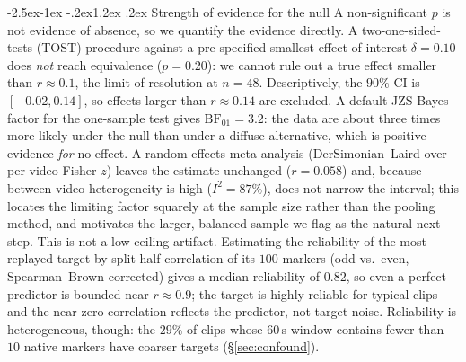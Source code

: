 \documentclass[11pt]{article}
\makeatletter
\renewcommand\subsection{\@startsection{subsection}{2}{\z@}%
  {-2.5ex\@plus -1ex \@minus -.2ex}{1.2ex \@plus .2ex}%
  {\normalfont\normalsize\sffamily\bfseries}}
\makeatother
\begin{document}
\subsection{Strength of evidence for the null}\label{sec:equiv}
A non-significant $p$ is not evidence of absence, so we quantify the evidence directly. A
two-one-sided-tests (TOST) procedure against a pre-specified smallest effect of interest
$\delta=0.10$ does \emph{not} reach equivalence ($p=0.20$): we cannot rule out a true effect smaller
than $r\approx0.1$, the limit of resolution at $n{=}48$. Descriptively, the $90\%$ CI is
$[-0.02,0.14]$, so effects larger than $r\approx0.14$ are excluded. A default JZS Bayes factor for
the one-sample test gives
$\mathrm{BF}_{01}=3.2$: the data are about three times more likely under the null than under a
diffuse alternative, which is positive evidence \emph{for} no effect. A random-effects
meta-analysis (DerSimonian--Laird over per-video Fisher-$z$) leaves the estimate unchanged
($r=0.058$) and, because between-video heterogeneity is high ($I^2=87\%$), does not narrow the
interval; this locates the limiting factor squarely at the sample size rather than the pooling
method, and motivates the larger, balanced sample we flag as the natural next step.
This is not a low-ceiling artifact. Estimating the reliability of the most-replayed target by
split-half correlation of its $100$ markers (odd vs.\ even, Spearman--Brown corrected) gives a
median reliability of $0.82$, so even a perfect predictor is bounded near $r\approx0.9$; the target
is highly reliable for typical clips and the near-zero correlation reflects the predictor, not
target noise. Reliability is heterogeneous, though: the $29\%$ of clips whose $60$\,s window
contains fewer than $10$ native markers have coarser targets (\S\ref{sec:confound}).
\end{document}
